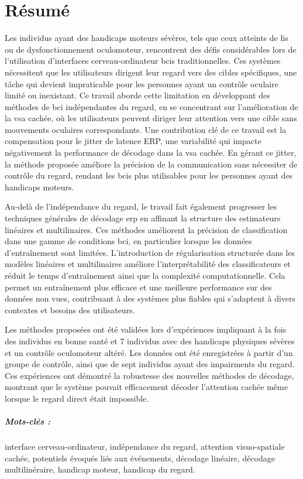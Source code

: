 \chapter*{R\'esum\'e}
Les individus ayant des handicaps moteurs sévères, tels que ceux atteints de \ac{lis} ou de dysfonctionnement oculomoteur, rencontrent des défis considérables lors de l'utilisation d'interfaces cerveau-ordinateur \acp{bci} traditionnelles.
Ces systèmes nécessitent que les utilisateurs dirigent leur regard vers des cibles spécifiques, une tâche qui devient impraticable pour les personnes ayant un contrôle oculaire limité ou inexistant.
Ce travail aborde cette limitation en développant des méthodes de \ac{bci} indépendantes du regard, en se concentrant sur l'amélioration de la \ac{vsa} cachée, où les utilisateurs peuvent diriger leur attention vers une cible sans mouvements oculaires correspondants.
Une contribution clé de ce travail est la compensation pour le jitter de latence ERP, une variabilité qui impacte négativement la performance de décodage dans la \ac{vsa} cachée.
En gérant ce jitter, la méthode proposée améliore la précision de la communication sans nécessiter de contrôle du regard, rendant les \acp{bci} plus utilisables pour les personnes ayant des handicaps moteurs.

Au-delà de l'indépendance du regard, le travail fait également progresser les techniques générales de décodage \ac{erp} en affinant la structure des estimateurs linéaires et multilinaires.
Ces méthodes améliorent la précision de classification dans une gamme de conditions \ac{bci}, en particulier lorsque les données d'entraînement sont limitées.
L'introduction de régularisation structurée dans les modèles linéaires et multilinaires améliore l'interprétabilité des classificateurs et réduit le temps d'entraînement ainsi que la complexité computationnelle.
Cela permet un entraînement plus efficace et une meilleure performance sur des données non vues, contribuant à des systèmes plus fiables qui s'adaptent à divers contextes et besoins des utilisateurs.

Les méthodes proposées ont été validées lors d'expériences impliquant à la fois des individus en bonne santé et 7 individus avec des handicaps physiques sévères et un contrôle oculomoteur altéré.
Les données ont été enregistrées à partir d'un groupe de contrôle, ainsi que de sept individus ayant des impairments du regard.
Ces expériences ont démontré la robustesse des nouvelles méthodes de décodage, montrant que le système pouvait efficacement décoder l'attention cachée même lorsque le regard direct était impossible.

\paragraph{Mots-clés :} interface cerveau-ordinateur, indépendance du regard, attention visuo-spatiale cachée, potentiels évoqués liés aux événements, décodage linéaire, décodage multilinéraire, handicap moteur, handicap du regard.
